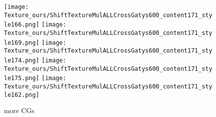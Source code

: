 \documentclass[runningheads]{llncs}
\begin{document}
\begin{figure*}[!htbp]
\begin{subfigure}[t]{0.15\textwidth}
	\texttt{[image: Texture\_ours/ShiftTextureMulALLCrossGatys600\_content171\_style166.png]}
    \texttt{[image: Texture\_ours/ShiftTextureMulALLCrossGatys600\_content171\_style169.png]}
    \texttt{[image: Texture\_ours/ShiftTextureMulALLCrossGatys600\_content171\_style174.png]}
    \texttt{[image: Texture\_ours/ShiftTextureMulALLCrossGatys600\_content171\_style175.png]}
    \texttt{[image: Texture\_ours/ShiftTextureMulALLCrossGatys600\_content171\_style162.png]}
    \caption{more CGs}
\end{subfigure}
\begin{subfigure}[t]{0.153\textwidth}
	

\end{subfigure}
\end{figure*}
\end{document}
